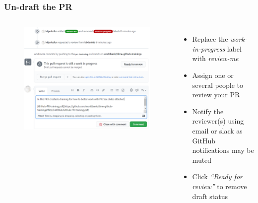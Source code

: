 \documentclass[aspectratio=169]{beamer} %
\begin{document}
\begin{frame}
	\frametitle{Un-draft the PR}
	\begin{columns}[c]

	\vspace{-.75cm}
	\begin{figure}
		\centering
		\includegraphics[width=\textwidth]{./img/undraft-pr.png}
	\end{figure}

	\begin{itemize}
		\setlength\itemsep{1em}
		\item Replace the \textit{work-in-progress} label
		with \textit{review-me}
		\item Assign one or several people to review your PR
		\item Notify the reviewer(s) using email
		or slack as GitHub notifications may be muted
		\item Click \textit{``Ready for review''} to remove draft status
	\end{itemize}

\end{columns}
\end{frame}
\end{document}
